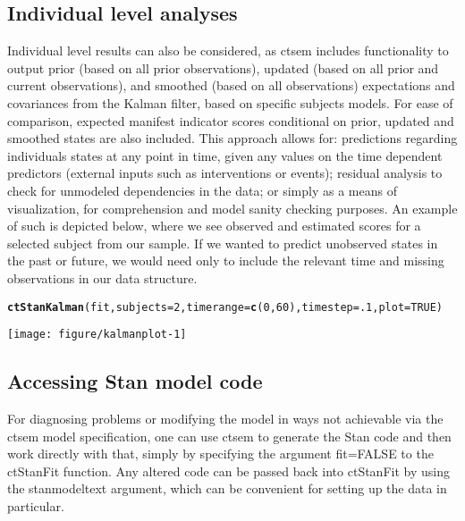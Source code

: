 \documentclass[nojss]{jss}\usepackage[]{graphicx}\usepackage[]{color}
\makeatletter
\def\maxwidth{ %
  \ifdim\Gin@nat@width>\linewidth
    \linewidth
  \else
    \Gin@nat@width
  \fi
}
\newcommand{\hlnum}[1]{\textcolor[rgb]{0.686,0.059,0.569}{#1}}%
\newcommand{\hlstd}[1]{\textcolor[rgb]{0.345,0.345,0.345}{#1}}%
\newcommand{\hlkwc}[1]{\textcolor[rgb]{0.333,0.667,0.333}{#1}}%
\newcommand{\hlkwd}[1]{\textcolor[rgb]{0.737,0.353,0.396}{\textbf{#1}}}%
\newenvironment{kframe}{%
 \def\at@end@of@kframe{}%
 \ifinner\ifhmode%
  \def\at@end@of@kframe{\end{minipage}}%
  \begin{minipage}{\columnwidth}%
 \fi\fi%
 \def\FrameCommand##1{\hskip\@totalleftmargin \hskip-\fboxsep
 \colorbox{shadecolor}{##1}\hskip-\fboxsep
     \hskip-\linewidth \hskip-\@totalleftmargin \hskip\columnwidth}%
 \MakeFramed {\advance\hsize-\width
   \@totalleftmargin\z@ \linewidth\hsize
   \@setminipage}}%
 {\par\unskip\endMakeFramed%
 \at@end@of@kframe}
\newenvironment{knitrout}{}{} %
\makeatother
\begin{document}
\subsection{Individual level analyses}
Individual level results can also be considered, as ctsem includes functionality to output prior (based on all prior observations), updated (based on all prior and current observations), and smoothed (based on all observations) expectations and covariances from the Kalman filter, based on specific subjects models. For ease of comparison, expected manifest indicator scores conditional on prior, updated and smoothed states are also included. This approach allows for: predictions regarding individuals states at any point in time, given any values on the time dependent predictors (external inputs such as interventions or events); residual analysis to check for unmodeled dependencies in the data; or simply as a means of visualization, for comprehension and model sanity checking purposes. An example of such is depicted below, where we see observed and estimated scores for a selected subject from our sample. If we wanted to predict unobserved states in the past or future, we would need only to include the relevant time and missing observations in our data structure.

\begin{knitrout}\small
{}\color{fgcolor}\begin{kframe}
\begin{alltt}
\hlkwd{ctStanKalman}\hlstd{(fit,} \hlkwc{subjects}\hlstd{=}\hlnum{2}\hlstd{,} \hlkwc{timerange}\hlstd{=}\hlkwd{c}\hlstd{(}\hlnum{0}\hlstd{,}\hlnum{60}\hlstd{),} \hlkwc{timestep}\hlstd{=}\hlnum{.1}\hlstd{,} \hlkwc{plot}\hlstd{=}\hlnum{TRUE}\hlstd{)}
\end{alltt}
\end{kframe}

{\centering \texttt{[image: figure/kalmanplot-1]} 

}



\end{knitrout}


\subsection{Accessing Stan model code}
For diagnosing problems or modifying the model in ways not achievable via the ctsem model specification, one can use ctsem to generate the Stan code and then work directly with that, simply by specifying the argument fit=FALSE to the ctStanFit function. Any altered code can be passed back into ctStanFit by using the stanmodeltext argument, which can be convenient for setting up the data in particular.
\end{document}
